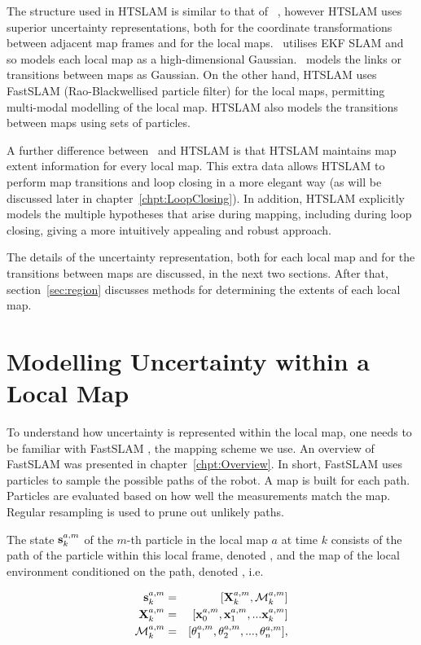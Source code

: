 The structure used in HTSLAM is similar to that of \Atlas\ 
\cite{bosse02atlas}, however HTSLAM uses superior uncertainty
representations, both for the coordinate transformations between
adjacent map frames and for the local maps. \Atlas\ utilises EKF SLAM
and so models each local map as a high-dimensional Gaussian.
\Atlas\ models the links or transitions between maps as Gaussian.  On
the other hand, HTSLAM uses FastSLAM (Rao-Blackwellised particle
filter) for the local maps, permitting multi-modal modelling of the
local map.  HTSLAM also models the transitions between maps using sets
of particles.

A further difference between \Atlas\ and HTSLAM is that HTSLAM
maintains map extent information for every local map. This extra data
allows HTSLAM to perform map transitions and loop closing in a more
elegant way (as will be discussed later in
chapter~\ref{chpt:LoopClosing}).  In addition, HTSLAM explicitly
models the multiple hypotheses that arise during mapping, including
during loop closing, giving a more intuitively appealing and robust
approach.

The details of the uncertainty representation, both for each local map
and for the transitions between maps are discussed, in the next two
sections.  After that, section~\ref{sec:region} discusses methods for
determining the extents of each local map.

\section{Modelling Uncertainty within a Local Map}
\label{sec:local_map}

To understand how uncertainty is represented within the local map, one
needs to be familiar with FastSLAM \cite{Montemerlo02d}, the mapping
scheme we use. An overview of FastSLAM was presented in
chapter~\ref{chpt:Overview}. In short, FastSLAM uses particles to
sample the possible paths of the robot. A map is built for each
path. Particles are evaluated based on how well the measurements match
the map.  Regular resampling is used to prune out unlikely paths.

The state $\s{k}{a}{m}$ of the $m$-th particle in the local map $a$
at time $k$ consists of the path of the particle within this local
frame, denoted \Xall{k}{a}{m}, and the map of the local environment
conditioned on the path, denoted \map{k}{a}{m}, i.e.


\begin{eqnarray}
 \s{k}{a}{m}    &=& [\Xall{k}{a}{m}, \map{k}{a}{m} ]\\
 \Xall{k}{a}{m} &=& [\x{0}{a}{m}, \x{1}{a}{m}, ... \x{k}{a}{m}]\\
 \map{k}{a}{m}  &=& [\mape{a}{m}{1}, \mape{a}{m}{2}, ..., \mape{a}{m}{n}],
\end{eqnarray}

